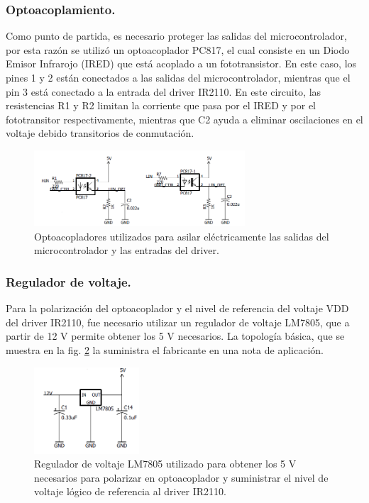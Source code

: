 \subsubsection{Optoacoplamiento.}
Como punto de partida, es necesario proteger las salidas del microcontrolador, por esta razón se utilizó un optoacoplador PC817, el cual consiste en un Diodo Emisor Infrarojo (IRED) que está acoplado a un fototransistor. En este caso, los pines 1 y 2 están conectados a las salidas del microcontrolador, mientras que el pin 3 está conectado a la entrada del driver IR2110. En este circuito, las resistencias R1 y R2 limitan la corriente que pasa por el IRED y por el fototransitor respectivamente, mientras que C2 ayuda a eliminar oscilaciones en el voltaje debido transitorios de conmutación. 
\begin{figure}[h!]
\begin{centering}
  \includegraphics[width=0.7\textwidth]{Images/Optoacoplador.png}
    \caption{Optoacopladores utilizados para asilar eléctricamente las salidas del microcontrolador y las entradas del driver.}
    \label{fig:optoacoplador}
  \par\end{centering}
\end{figure}
\subsubsection{Regulador de voltaje.}
Para la polarización del optoacoplador y el nivel de referencia del voltaje  VDD del driver IR2110, fue necesario utilizar un regulador de voltaje LM7805, que a partir de 12 V permite obtener los 5 V necesarios. La topología básica, que se muestra en la fig.  \ref{fig:Regulador} la suministra el fabricante en una nota  de aplicación. 
\begin{figure}[h!]
\begin{centering}
  \includegraphics[width=0.35\textwidth]{Images/Regulador.png}
    \caption{Regulador de voltaje LM7805 utilizado para obtener los 5 V necesarios para polarizar en optoacoplador y suministrar el nivel de voltaje lógico de referencia al driver IR2110.}
    \label{fig:Regulador}
  \par\end{centering}
\end{figure}
